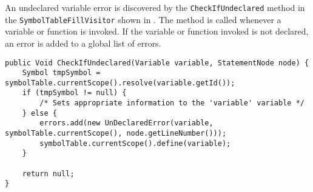 An undeclared variable error is discovered by the \texttt{CheckIfUndeclared} method in the \texttt{SymbolTableFillVisitor} shown in .
The method is called whenever a variable or function is invoked.
If the variable or function invoked is not declared, an error is added to a global list of errors. 
\begin{lstlisting}[caption=The CheckIfUndeclared method in the SymbolTableFillVisitor class in the \gls{gamble} compiler,numbers=none,frame=tlrb,label={lst:CheckIfUndeclared}]
public Void CheckIfUndeclared(Variable variable, StatementNode node) {
    Symbol tmpSymbol = symbolTable.currentScope().resolve(variable.getId());
    if (tmpSymbol != null) {
        /* Sets appropriate information to the 'variable' variable */
    } else {
        errors.add(new UnDeclaredError(variable, symbolTable.currentScope(), node.getLineNumber()));
        symbolTable.currentScope().define(variable);
    }

    return null;
}
\end{lstlisting}
